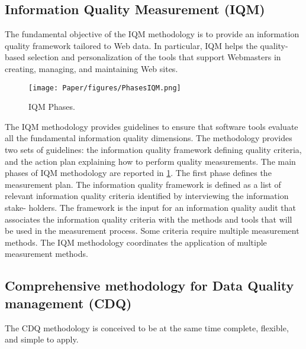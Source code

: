 \documentclass[pdftex,english,oribibl]{llncs}
\begin{document}
\subsection{Information Quality Measurement (IQM)}
The fundamental objective of the IQM methodology \cite{Eppler2002MeasuringIQ} is to provide an information quality framework tailored to Web data.
In particular, IQM helps the quality-based selection and personalization of the tools that support Webmasters in creating, managing, and maintaining Web sites.
\begin{figure}
    \centering
    \texttt{[image: Paper/figures/PhasesIQM.png]}
    \caption{IQM Phases.}
    \label{fig:PhasesIQM}
 \end{figure}

The IQM methodology provides guidelines to ensure that software tools evaluate all the fundamental information quality dimensions.
The methodology provides two sets of guidelines: the information quality framework defining quality criteria, and the action plan explaining how to perform quality measurements.
The main phases of IQM methodology are reported in \ref{fig:PhasesIQM}. The first phase defines the measurement plan.
The information quality framework is defined as a list of relevant information quality criteria identified by interviewing the information stake- holders.
The framework is the input for an information quality audit that associates the information quality criteria with the methods and tools that will be used in the measurement process.
Some criteria require multiple measurement methods. The IQM methodology coordinates the application of multiple measurement methods.

\subsection{Comprehensive methodology for Data Quality management (CDQ)}

The CDQ methodology \cite{Batini2006DQConceptsMethodologiesTechniques} \cite{Batini2008ComprehensiveDQ} is conceived to be at the same time complete, flexible, and simple to apply.

\begin{comment}
Completeness is achieved by considering existing techniques and tools and integrating them in a framework that can work in both intra- and inter-organizational contexts, and can be applied to all types of data, structured, semistructured and unstructured.
The methodology is flexible since it supports the user in the selection of the most suitable techniques and tools within each phase and in any context.
Finally, CDQ is simple since it is organized in phases and each phase is characterized by a specific goal and set of techniques to apply.

In fact, the other methodologies implicitly assume that contextual knowledge has been previously gathered and modelled.
\end{comment}
\end{document}
